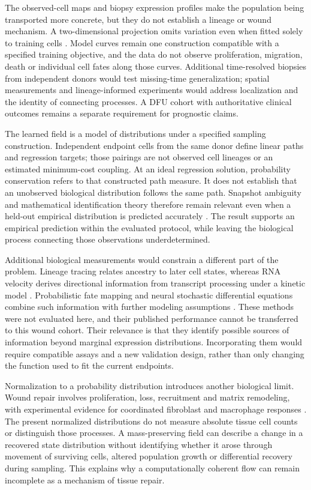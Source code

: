 \documentclass[10pt,a4paper]{article}
\begin{document}
The observed-cell maps and biopsy expression profiles make the population being transported more concrete, but they do not establish a lineage or wound mechanism. A two-dimensional projection omits variation even when fitted solely to training cells \citep{huang2022visualization}. Model curves remain one construction compatible with a specified training objective, and the data do not observe proliferation, migration, death or individual cell fates along those curves. Additional time-resolved biopsies from independent donors would test missing-time generalization; spatial measurements and lineage-informed experiments would address localization and the identity of connecting processes. A DFU cohort with authoritative clinical outcomes remains a separate requirement for prognostic claims.

The learned field is a model of distributions under a specified sampling construction. Independent endpoint cells from the same donor define linear paths and regression targets; those pairings are not observed cell lineages or an estimated minimum-cost coupling. At an ideal regression solution, probability conservation refers to that constructed path measure. It does not establish that an unobserved biological distribution follows the same path. Snapshot ambiguity and mathematical identification theory therefore remain relevant even when a held-out empirical distribution is predicted accurately \citep{weinreb2018,lavenant2021}. The result supports an empirical prediction within the evaluated protocol, while leaving the biological process connecting those observations underdetermined.

Additional biological measurements would constrain a different part of the problem. Lineage tracing relates ancestry to later cell states, whereas RNA velocity derives directional information from transcript processing under a kinetic model \citep{weinreb2020,lamanno2018,bergen2020}. Probabilistic fate mapping and neural stochastic differential equations combine such information with further modeling assumptions \citep{lange2022,vinyard2025}. These methods were not evaluated here, and their published performance cannot be transferred to this wound cohort. Their relevance is that they identify possible sources of information beyond marginal expression distributions. Incorporating them would require compatible assays and a new validation design, rather than only changing the function used to fit the current endpoints.

Normalization to a probability distribution introduces another biological limit. Wound repair involves proliferation, loss, recruitment and matrix remodeling, with experimental evidence for coordinated fibroblast and macrophage responses \citep{rognoni2018,shook2018}. The present normalized distributions do not measure absolute tissue cell counts or distinguish those processes. A mass-preserving field can describe a change in a recovered state distribution without identifying whether it arose through movement of surviving cells, altered population growth or differential recovery during sampling. This explains why a computationally coherent flow can remain incomplete as a mechanism of tissue repair.
\end{document}
